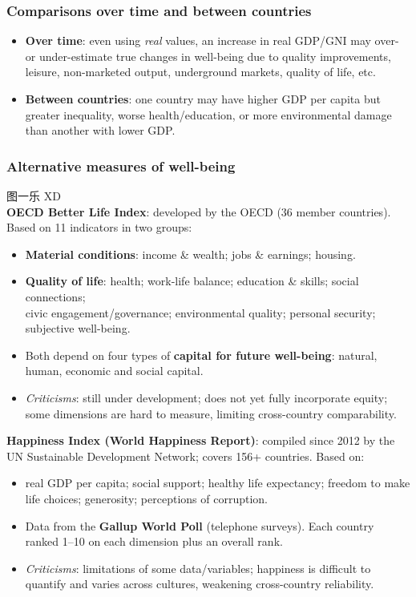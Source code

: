 \documentclass[a4paper,12pt]{article}
\begin{document}
\subsubsection*{Comparisons over time and between countries}
\begin{itemize}
  \item \textbf{Over time}: even using \textit{real} values, an increase in real GDP/GNI may over- or under-estimate true changes in well-being due to quality improvements, leisure, non-marketed output, underground markets, quality of life, etc.
  \item \textbf{Between countries}: one country may have higher GDP per capita but greater inequality, worse health/education, or more environmental damage than another with lower GDP.
\end{itemize}
\subsubsection*{Alternative measures of well-being}
图一乐 XD\\
\textbf{OECD Better Life Index}: developed by the OECD (36 member countries). Based on 11 indicators in two groups:
\begin{itemize}
  \item \textbf{Material conditions}: income \& wealth; jobs \& earnings; housing.
  \item \textbf{Quality of life}: health; work-life balance; education \& skills; social connections; \\civic engagement/governance; environmental quality; personal security; subjective well-being.
  \item Both depend on four types of \textbf{capital for future well-being}: natural, human, economic and social capital.
  \item \textit{Criticisms}: still under development; does not yet fully incorporate equity; some dimensions are hard to measure, limiting cross-country comparability.
\end{itemize}
\textbf{Happiness Index (World Happiness Report)}: compiled since 2012 by the UN Sustainable Development Network; covers 156+ countries. Based on:
\begin{itemize}
  \item real GDP per capita; social support; healthy life expectancy; freedom to make life choices; generosity; perceptions of corruption.
  \item Data from the \textbf{Gallup World Poll} (telephone surveys). Each country ranked 1--10 on each dimension plus an overall rank.
  \item \textit{Criticisms}: limitations of some data/variables; happiness is difficult to quantify and varies across cultures, weakening cross-country reliability.
\end{itemize}
\end{document}
